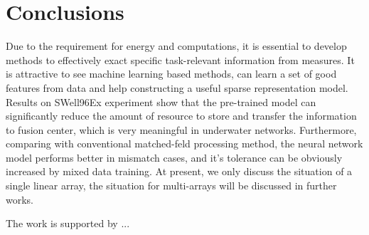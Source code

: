 \section{Conclusions}
Due to the requirement for energy and computations, it is essential to develop methods to effectively exact specific task-relevant information from measures.
It is attractive to see machine learning based methods, can learn a set of good features from data and help constructing a useful sparse representation model.
Results on SWell96Ex experiment show that the pre-trained model can significantly reduce the amount of resource to store and transfer the information to fusion center, which is very meaningful in underwater networks. Furthermore, comparing with conventional matched-feld processing method, the neural network model performs better in mismatch cases, and it's tolerance can be obviously increased by mixed data training.
At present, we only discuss the situation of a single linear array, the situation for multi-arrays will be discussed in further works. 

\begin{acks}
The work is supported by ...

\end{acks}
